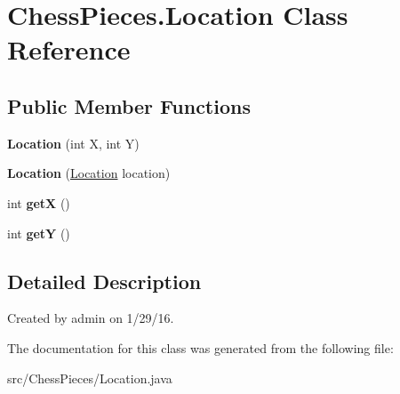 \hypertarget{class_chess_pieces_1_1_location}{}\section{Chess\+Pieces.\+Location Class Reference}
\label{class_chess_pieces_1_1_location}
\subsection*{Public Member Functions}
\begin{DoxyCompactItemize}
\item 
{\bfseries Location} (int X, int Y)\hypertarget{class_chess_pieces_1_1_location_a94cdcfceb6029787d9c348669203b5b9}{}\label{class_chess_pieces_1_1_location_a94cdcfceb6029787d9c348669203b5b9}

\item 
{\bfseries Location} (\hyperlink{class_chess_pieces_1_1_location}{Location} location)\hypertarget{class_chess_pieces_1_1_location_ab804abd66087a2e8c22eeab035796aac}{}\label{class_chess_pieces_1_1_location_ab804abd66087a2e8c22eeab035796aac}

\item 
int {\bfseries getX} ()\hypertarget{class_chess_pieces_1_1_location_a46d171d84f3e6341444eeadecc464cfb}{}\label{class_chess_pieces_1_1_location_a46d171d84f3e6341444eeadecc464cfb}

\item 
int {\bfseries getY} ()\hypertarget{class_chess_pieces_1_1_location_aa63877b6b586586a9f97146e98517b5c}{}\label{class_chess_pieces_1_1_location_aa63877b6b586586a9f97146e98517b5c}

\end{DoxyCompactItemize}


\subsection{Detailed Description}
Created by admin on 1/29/16. 

The documentation for this class was generated from the following file\+:\begin{DoxyCompactItemize}
\item 
src/\+Chess\+Pieces/Location.\+java\end{DoxyCompactItemize}
